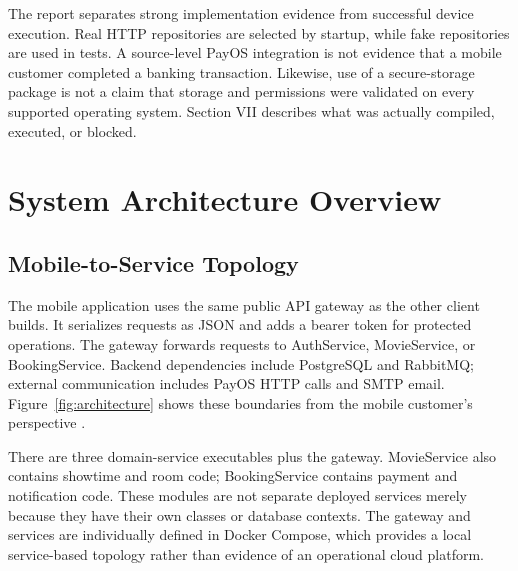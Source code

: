 \documentclass[conference]{IEEEtran}
\begin{document}
The report separates strong implementation evidence from successful device
execution. Real HTTP repositories are selected by startup, while fake
repositories are used in tests. A source-level PayOS integration is not evidence
that a mobile customer completed a banking transaction. Likewise, use of a
secure-storage package is not a claim that storage and permissions were
validated on every supported operating system. Section VII describes what was
actually compiled, executed, or blocked.

\section{System Architecture Overview}
\subsection{Mobile-to-Service Topology}
The mobile application uses the same public API gateway as the other client
builds. It serializes requests as JSON and adds a bearer token for protected
operations. The gateway forwards requests to AuthService, MovieService, or
BookingService. Backend dependencies include PostgreSQL and RabbitMQ; external
communication includes PayOS HTTP calls and SMTP email. Figure~\ref{fig:architecture}
shows these boundaries from the mobile customer's perspective
\cite{client,gateway,deployment}.


There are three domain-service executables plus the gateway. MovieService also
contains showtime and room code; BookingService contains payment and
notification code. These modules are not separate deployed services merely
because they have their own classes or database contexts. The gateway and
services are individually defined in Docker Compose, which provides a local
service-based topology rather than evidence of an operational cloud platform.
\end{document}
